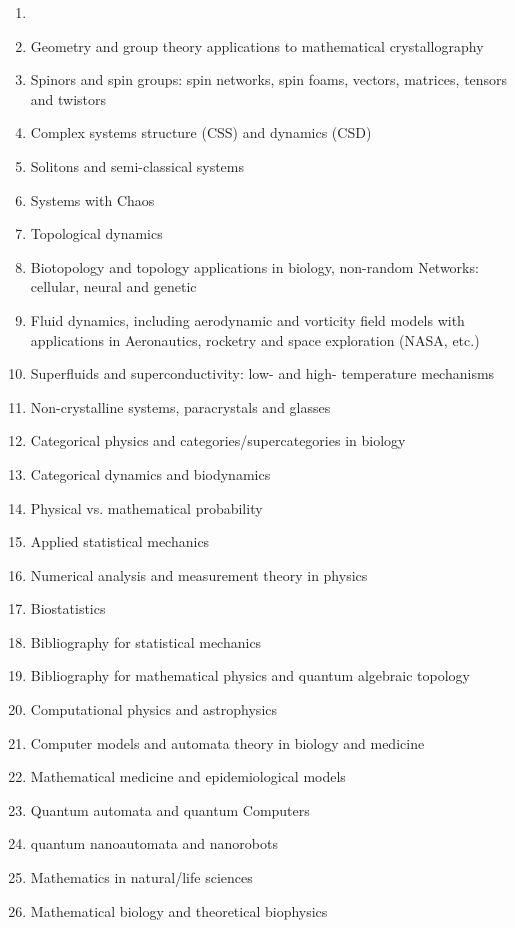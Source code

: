 \documentclass[12pt]{article}
\begin{document}
\begin{enumerate}
\item {}
\item Geometry and group theory applications to mathematical crystallography
\item Spinors and spin groups: spin networks, spin foams, vectors, matrices, tensors and twistors
\item Complex systems structure (CSS) and dynamics (CSD)
\item Solitons and semi-classical systems
\item Systems with Chaos
\item Topological dynamics
\item Biotopology and topology applications in biology, non-random Networks: cellular, neural and genetic
\item Fluid dynamics, including aerodynamic and vorticity field models with applications in Aeronautics, 
rocketry and space exploration (NASA, etc.)
\item Superfluids and superconductivity: low- and high- temperature mechanisms
\item Non-crystalline systems, paracrystals and glasses
\item Categorical physics and categories/supercategories in biology
\item Categorical dynamics and biodynamics
\item Physical vs. mathematical probability 
\item Applied statistical mechanics
\item Numerical analysis and measurement theory in physics
\item Biostatistics
\item Bibliography for statistical mechanics
\item Bibliography for mathematical physics and quantum algebraic topology
\item Computational physics and astrophysics
\item Computer models and automata theory in biology and medicine 
\item Mathematical medicine and epidemiological models
\item Quantum automata and quantum Computers
\item quantum nanoautomata and nanorobots
\item Mathematics in natural/life sciences
\item Mathematical biology and theoretical biophysics

\end{enumerate}
\end{document}
